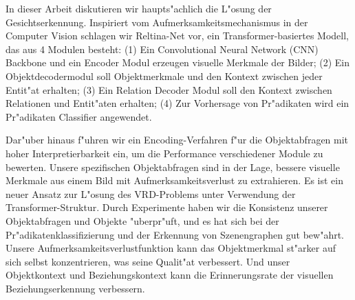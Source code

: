 In dieser Arbeit diskutieren wir haupts"achlich die L"osung der Gesichtserkennung. Inspiriert vom Aufmerksamkeitsmechanismus in der Computer Vision schlagen wir Reltina-Net vor, ein Transformer-basiertes Modell, das aus 4 Modulen besteht: (1) Ein Convolutional Neural Network (CNN) Backbone und ein Encoder Modul erzeugen visuelle Merkmale der Bilder; (2) Ein Objektdecodermodul soll Objektmerkmale und den Kontext zwischen jeder Entit"at erhalten; (3) Ein Relation Decoder Modul soll den Kontext zwischen Relationen und Entit"aten erhalten; (4) Zur Vorhersage von Pr"adikaten wird ein Pr"adikaten Classifier angewendet.

Dar"uber hinaus f"uhren wir ein Encoding-Verfahren f"ur die Objektabfragen mit hoher Interpretierbarkeit ein, um die Performance verschiedener Module zu bewerten. Unsere spezifischen Objektabfragen sind in der Lage, bessere visuelle Merkmale aus einem Bild mit Aufmerksamkeitsverlust zu extrahieren. Es ist ein neuer Ansatz zur L"osung des VRD-Problems unter Verwendung der Transformer-Struktur. Durch Experimente haben wir die Konsistenz unserer Objektabfragen und Objekte "uberpr"uft, und es hat sich bei der Pr"adikatenklassifizierung und der Erkennung von Szenengraphen gut bew"ahrt. Unsere Aufmerksamkeitsverlustfunktion kann das Objektmerkmal st"arker auf sich selbst konzentrieren, was seine Qualit"at verbessert. Und unser Objektkontext und Beziehungskontext kann die Erinnerungsrate der visuellen Beziehungserkennung verbessern.